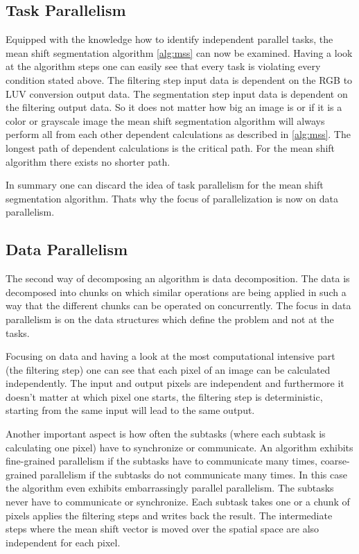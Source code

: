 \subsection{Task Parallelism} %
\label{sub:task_parallelism}

Equipped with the knowledge how to identify independent parallel tasks, the mean
shift segmentation algorithm \autoref{alg:mss} can now be examined. Having a
look at the algorithm steps one can easily see that every task is violating
every condition stated above. The filtering step input data is dependent on the
\gls{RGB} to \gls{LUV} conversion output data. The segmentation step input data
is dependent on the filtering output data. So it does not matter how big an
image is or if it is a color or grayscale image the mean shift segmentation
algorithm will always perform all from each other dependent calculations as
described in \autoref{alg:mss}. The longest path of dependent calculations is
the critical path. For the mean shift algorithm there exists no shorter path.

In summary one can discard the idea of task parallelism for the mean shift
segmentation algorithm. Thats why the focus of parallelization is now on data
parallelism. 


\subsection{Data Parallelism} %
\label{sub:data_parallelism}
The second way of decomposing an algorithm is data decomposition. The data is
decomposed into chunks on which similar operations are being applied in such a
way that the different chunks can be operated on concurrently. The focus in data
parallelism is on the data structures which define the problem and not at the
tasks.

Focusing on data and having a look at the most computational intensive part (the
filtering step) one can see that each pixel of an image can be calculated
independently. The input and output pixels are independent and furthermore it
doesn't matter at which pixel one starts, the filtering step is deterministic,
starting from the same input will lead to the same output.

Another important aspect is how often the subtasks (where each subtask is
calculating one pixel) have to synchronize or communicate. An algorithm exhibits
fine-grained parallelism if the subtasks have to communicate many times,
coarse-grained parallelism if the subtasks do not communicate many times. In
this case the algorithm even exhibits embarrassingly parallel parallelism. The
subtasks never have to communicate or synchronize. Each subtask takes one or a
chunk of pixels applies the filtering steps and writes back the result. The
intermediate steps where the mean shift vector is moved over the spatial space
are also independent for each pixel.

